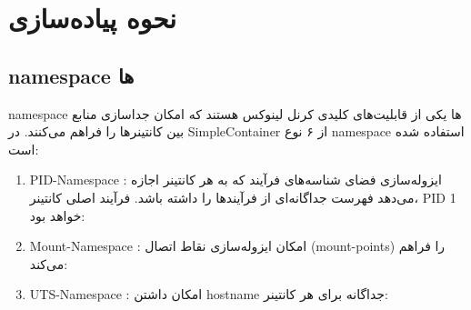 \documentclass[10pt,a4paper]{article}
\begin{document}
\section{نحوه پیاده‌سازی}

\subsection{namespace ها}

namespace ها یکی از قابلیت‌های کلیدی کرنل لینوکس هستند که امکان جداسازی منابع بین کانتینرها را فراهم می‌کنند. در SimpleContainer از ۶ نوع namespace استفاده شده است:

\begin{enumerate}
  \item PID-Namespace : ایزوله‌سازی فضای شناسه‌های فرآیند که به هر کانتینر اجازه می‌دهد فهرست جداگانه‌ای از فرآیندها را داشته باشد. فرآیند اصلی کانتینر، PID 1 خواهد بود:
  
  {
}

\item 
    Mount-Namespace : امکان ایزوله‌سازی نقاط اتصال (mount-points) را فراهم می‌کند:
  
  {
}

\item 
    UTS-Namespace : امکان داشتن hostname جداگانه برای هر کانتینر:
	  
  {
	}
\end{enumerate}
\end{document}
